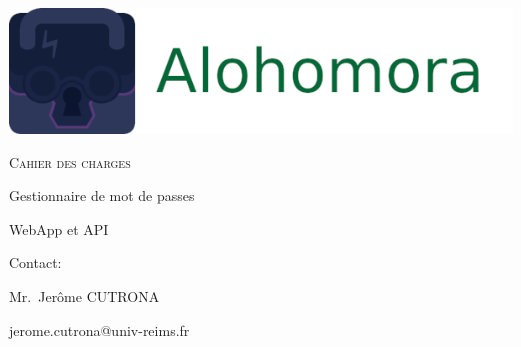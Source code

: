 \documentclass[oneside]{report}
\author{Nathan JANCZEWSKI, Léo BERGEROT}
\begin{document}
	\begin{titlepage}
		\centering
		\includegraphics[scale=.5]{logo_large}
		\vspace{5cm}
		{\par\scshape\Huge Cahier des charges\par}
		\vspace{5cm}
		{\par Gestionnaire de mot de passes\par}
		{\par WebApp et API\par}
		\vfill
		\par Contact:
		{\par\small Mr.\ Jerôme CUTRONA \par}
		\par jerome.cutrona@univ-reims.fr\
	\end{titlepage}

	\pagestyle{fancy}
	\fancyhf{}
	\tableofcontents
\end{document}
